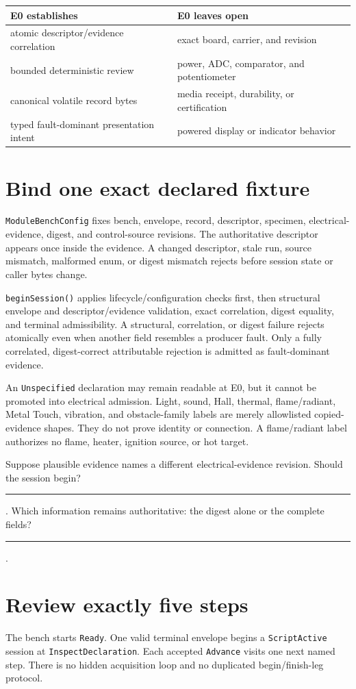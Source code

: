 \documentclass[10pt]{article}
\newcommand{\blankline}{\rule{0.80in}{0.4pt}}
\newcommand{\longblank}{\rule{1.45in}{0.4pt}}
\begin{document}
\begin{tabularx}{\linewidth}{@{}X X@{}}
\toprule
E0 establishes & E0 leaves open\\
\midrule
atomic descriptor/evidence correlation & exact board, carrier, and revision\\
bounded deterministic review & power, ADC, comparator, and potentiometer\\
canonical volatile record bytes & media receipt, durability, or certification\\
typed fault-dominant presentation intent & powered display or indicator behavior\\
\bottomrule
\end{tabularx}

\newpage
\section{Bind one exact declared fixture}
\texttt{ModuleBenchConfig} fixes bench, envelope, record, descriptor,
specimen, electrical-evidence, digest, and control-source revisions. The
authoritative descriptor appears once inside the evidence. A changed
descriptor, stale run, source mismatch, malformed enum, or digest mismatch
rejects before session state or caller bytes change.

\texttt{beginSession()} applies lifecycle/configuration checks first, then
structural envelope and descriptor/evidence validation, exact correlation,
digest equality, and terminal admissibility. A structural, correlation, or
digest failure rejects atomically even when another field resembles a
producer fault. Only a fully correlated, digest-correct attributable
rejection is admitted as fault-dominant evidence.

An \texttt{Unspecified} declaration may remain readable at E0, but it cannot
be promoted into electrical admission. Light, sound, Hall, thermal,
flame/radiant, Metal Touch, vibration, and obstacle-family labels are merely
allowlisted copied-evidence shapes. They do not prove identity or connection.
A flame/radiant label authorizes no flame, heater, ignition source, or hot
target.

Suppose plausible evidence names a different electrical-evidence revision.
Should the session begin? \blankline. Which information remains authoritative:
the digest alone or the complete fields? \longblank.

\section{Review exactly five steps}
The bench starts \texttt{Ready}. One valid terminal envelope begins a
\texttt{ScriptActive} session at \texttt{InspectDeclaration}. Each accepted
\texttt{Advance} visits one next named step. There is no hidden acquisition
loop and no duplicated begin/finish-leg protocol.
\end{document}

